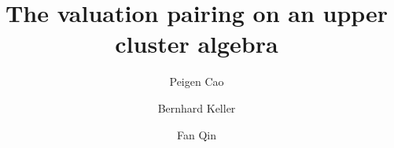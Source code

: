 \documentclass{amsart}
\theoremstyle{definition}
\theoremstyle{remark}
\numberwithin{equation}{section}
\begin{document}
\title{The valuation pairing on an upper cluster algebra}




\author{Peigen Cao}

\address{School of Mathematical Sciences, University of Science and Technology of China,
Hefei 230026, Anhui, P. R. China;and
\newline
Graduate School of Mathematics, Nagoya University, Chikusa-ku, Nagoya, 464-8604, Japan; and 
\newline
Universit\'e Paris Cit\'e,
    UFR de Math\'ematiques,
    CNRS,
   Institut de Math\'ematiques de Jussieu--Paris Rive Gauche, IMJ-PRG,
    B\^{a}timent Sophie Germain,
    75205 Paris Cedex 13,
    France
    }


\author{Bernhard Keller}
\address{ Universit\'e Paris Cit\'e\\
    UFR de Math\'ematiques\\
    CNRS\\
   Institut de Math\'ematiques de Jussieu--Paris Rive Gauche, IMJ-PRG \\
    B\^{a}timent Sophie Germain\\
    75205 Paris Cedex 13\\
    France
}

\author{Fan Qin}
\address{
    School of Mathematical Sciences\\
    Shanghai Jiao Tong University\\
    Shanghai 200240\\
    China
}





\date{}

\dedicatory{}

\end{document}
